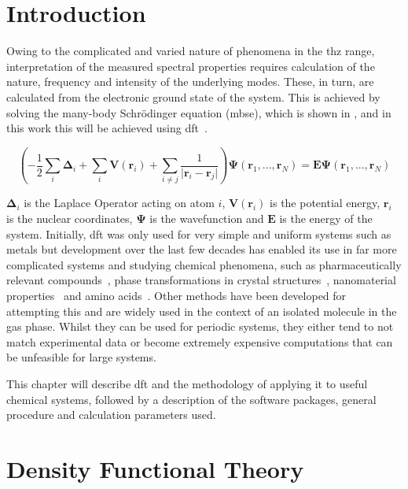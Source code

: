 \section{Introduction}
Owing to the complicated and varied nature of phenomena in the \acrshort{thz} range, interpretation of the measured spectral properties requires calculation of the nature, frequency and intensity of the underlying modes. These, in turn, are calculated from the electronic ground state of the system. This is achieved by solving the many-body Schr\"{o}dinger equation (\acrshort{mbse}), which is shown in , and in this work this will be achieved using \acrfull{dft}~\cite{Kohn1965}.

\begin{equation}
\left( -\frac{1}{2}\sum_i\boldsymbol{\Delta}_i + \sum_i \boldsymbol{V}(\mathbf{r}_i) + \sum_{i\neq j}\frac{1}{ \lvert \mathbf{r}_i - \mathbf{r}_j \rvert } \right) \boldsymbol{\Psi} (\mathbf{r}_1, ..., \mathbf{r}_N) = \boldsymbol{E}\boldsymbol{\Psi} (\mathbf{r}_1, ..., \mathbf{r}_N)
\label{eqn:MBSE}
\end{equation}

\(\boldsymbol{\Delta}_i\) is the Laplace Operator acting on atom \(i\), \(\boldsymbol{V}(\mathbf{r}_i)\) is the potential energy, \(\mathbf{r}_i\) is the nuclear coordinates, \(\boldsymbol{\Psi}\) is the wavefunction and \(\boldsymbol{E}\) is the energy of the system. Initially, \acrshort{dft} was only used for very simple and uniform systems such as metals but development over the last few decades has enabled its use in far more complicated systems and studying chemical phenomena, such as pharmaceutically relevant compounds~\cite{Berzins2020}, phase transformations in crystal structures~\cite{Ruggiero2018, Paul2019}, nanomaterial properties~\cite{Makkar2021} and amino acids~\cite{Hachtel2019}. Other methods have been developed for attempting this and are widely used in the context of an isolated molecule in the gas phase. Whilst they can be used for periodic systems, they either tend to not match experimental data or become extremely expensive computations that can be unfeasible for large systems.

This chapter will describe \acrshort{dft} and the methodology of applying it to useful chemical systems, followed by a description of the software packages, general procedure and calculation parameters used. 

\section{Density Functional Theory}
\label{sec:DFTheory}
